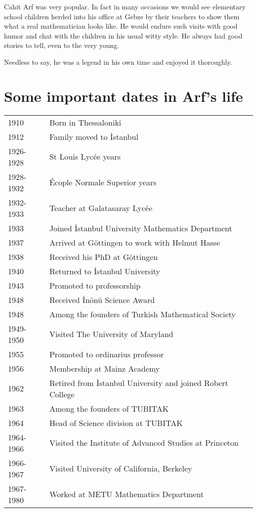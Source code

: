 \documentclass[12pt]{amsart}
\begin{document}
Cahit Arf was very popular. In fact in many occasions we would see elementary school children herded into his office at Gebze by their teachers to show them what a real mathematician looks like. He would endure such visits with good humor and chat with the children in his usual witty style. He always had good stories to tell, even to the very young.

Needless to say, he was a legend in his own time and enjoyed it thoroughly.

\section{Some important dates in Arf's life}
\begin{tabular}{ll}
1910 & Born in Thessaloniki \\
1912 & Family moved to {\.I}stanbul \\
1926-1928 & St Louis Lyc\'ee years \\
1928-1932 & \'Ecople Normale Superior years \\
1932-1933 & Teacher at Galatasaray Lyc\'ee \\
1933 & Joined {\.I}stanbul University Mathematics Department \\
1937 & Arrived at G\"{o}ttingen to work with Helmut Hasse \\
1938 & Received his PhD at G\"{o}ttingen \\
1940 & Returned to {\.I}stanbul University \\
1943 & Promoted to professorship \\
1948 & Received {\.I}n\"{o}n\"{u} Science Award \\
1948 & Among the founders of Turkish Mathematical Society \\
1949-1950 & Visited The University of Maryland  \\
1955 & Promoted to ordinarius professor  \\
1956 & Membership at Mainz Academy \\
1962 & Retired from {\.I}stanbul University and joined Robert College \\
1963 & Among the founders of TUBITAK \\
1964 & Head of Science division at TUBITAK \\
1964-1966 & Visited the Institute of Advanced Studies at Princeton \\
1966-1967 & Visited University of California, Berkeley \\
1967-1980 & Worked at METU Mathematics Department \\

\end{tabular}
\end{document}
